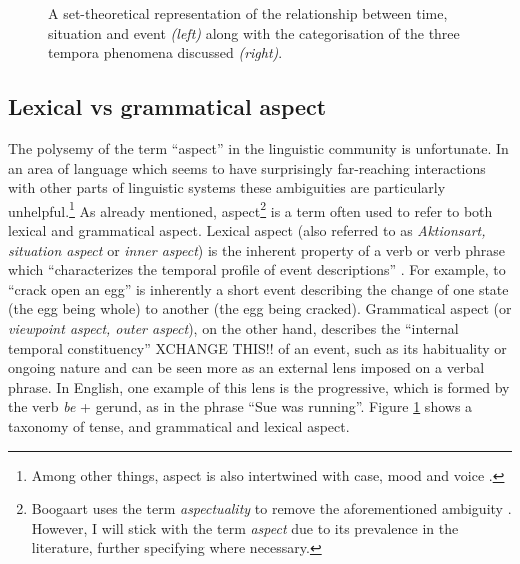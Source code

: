 \begin{figure}
    \hspace{2cm}
    \caption{A set-theoretical representation of the relationship between time, situation and event \emph{(left)} along with the categorisation of the three tempora phenomena discussed \emph{(right)}.}
    \label{fig:TimeSitEvent}
\end{figure}

\subsection{Lexical vs grammatical aspect}
The polysemy of the term “aspect” in the linguistic community is unfortunate. In an area of language which seems to have surprisingly far-reaching interactions with other parts of linguistic systems these ambiguities are particularly unhelpful.\footnote{Among other things, aspect is also intertwined with case, mood and voice \citep{franks2005slavic, Kiparsky2004PartitiveCA}.}
As already mentioned, aspect\footnote{Boogaart uses the term \emph{aspectuality} to remove the aforementioned ambiguity \citep{Boogaart+2004+1165+1180}. However, I will stick with the term \emph{aspect} due to its prevalence in the literature, further specifying where necessary.} is a term often used to refer to both lexical and grammatical aspect. Lexical aspect (also referred to as \emph{Aktionsart, situation aspect} or \emph{inner aspect}) is the inherent property of a verb or verb phrase which “characterizes the temporal profile of event descriptions” \citep{10.1093/oxfordhb/9780199601264.013.25}. For example, to “crack open an egg” is inherently a short event describing the change of one state (the egg being whole) to another (the egg being cracked). Grammatical aspect (or \emph{viewpoint aspect, outer aspect}), on the other hand, describes the “internal temporal constituency” \citep{comrie1976aspect} XCHANGE THIS!! of an event, such as its habituality or ongoing nature and can be seen more as an external lens imposed on a verbal phrase. In English, one example of this lens is the progressive, which is formed by the verb \emph{be} + gerund, as in the phrase “Sue was running”. Figure \ref{fig:TimeSitEvent} shows a taxonomy of tense, and grammatical and lexical aspect.

